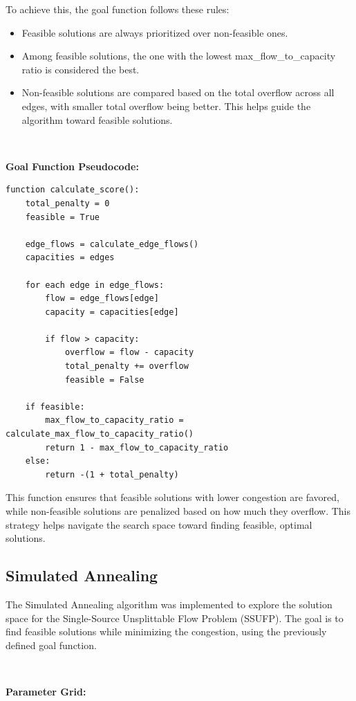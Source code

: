 \documentclass[a4paper,12pt]{article}
\begin{document}
To achieve this, the goal function follows these rules:
\begin{itemize}
    \item Feasible solutions are always prioritized over non-feasible ones.
    \item Among feasible solutions, the one with the lowest max\_flow\_to\_capacity ratio is considered the best.
    \item Non-feasible solutions are compared based on the total overflow across all edges, with smaller total overflow being better. This helps guide the algorithm toward feasible solutions.
\end{itemize}

\

\noindent \textbf{Goal Function Pseudocode:}

\begin{verbatim}
function calculate_score():
    total_penalty = 0
    feasible = True
    
    edge_flows = calculate_edge_flows()
    capacities = edges

    for each edge in edge_flows:
        flow = edge_flows[edge]
        capacity = capacities[edge]

        if flow > capacity:
            overflow = flow - capacity
            total_penalty += overflow
            feasible = False

    if feasible:
        max_flow_to_capacity_ratio = calculate_max_flow_to_capacity_ratio()
        return 1 - max_flow_to_capacity_ratio
    else:
        return -(1 + total_penalty)
\end{verbatim}

This function ensures that feasible solutions with lower congestion are favored, while non-feasible solutions are penalized based on how much they overflow. This strategy helps navigate the search space toward finding feasible, optimal solutions.

\subsection{Simulated Annealing}

The Simulated Annealing algorithm was implemented to explore the solution space for the Single-Source Unsplittable Flow Problem (SSUFP). The goal is to find feasible solutions while minimizing the congestion, using the previously defined goal function.

\

\noindent \textbf{Parameter Grid:}
\end{document}
